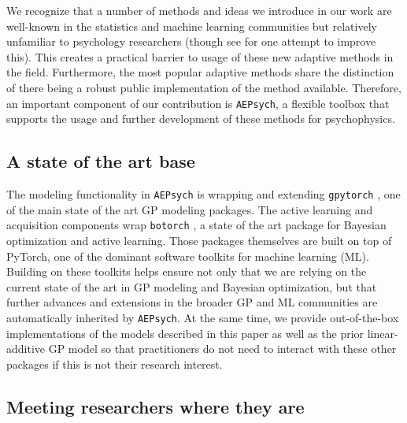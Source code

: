 \documentclass[../main.tex]{subfiles}
\begin{document}
We recognize that a number of methods and ideas we introduce in our work are well-known in the statistics and machine learning communities but relatively unfamiliar to psychology researchers (though see \cite{Schulz2018} for one attempt to improve this). This creates a practical barrier to usage of these new adaptive methods in the field. Furthermore, the most popular adaptive methods share the distinction of there being a robust public implementation of the method available. Therefore, an important component of our contribution is \texttt{AEPsych}, a flexible toolbox that supports the usage and further development of these methods for psychophysics.

\subsection{A state of the art base}

The modeling functionality in \texttt{AEPsych} is wrapping and extending \texttt{gpytorch} \citep{Gardner2018}, one of the main state of the art GP modeling packages. The active learning and acquisition components wrap \texttt{botorch} \citep{Balandat2020}, a state of the art package for Bayesian optimization and active learning. Those packages themselves are built on top of PyTorch, one of the dominant software toolkits for machine learning (ML). Building on these toolkits helps ensure not only that we are relying on the current state of the art in GP modeling and Bayesian optimization, but that further advances and extensions in the broader GP and ML communities are automatically inherited by \texttt{AEPsych}. At the same time, we provide out-of-the-box implementations of the models described in this paper as well as the prior linear-additive GP model so that practitioners do not need to interact with these other packages if this is not their research interest.

\subsection{Meeting researchers where they are}
\end{document}
